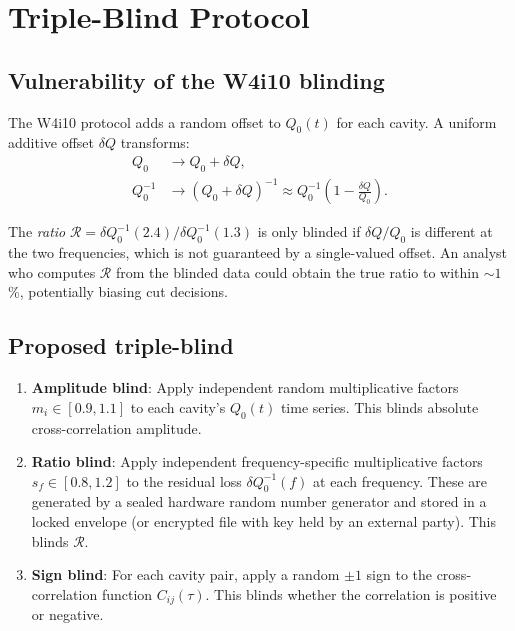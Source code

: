 \documentclass[11pt]{article}
\theoremstyle{definition}
\theoremstyle{remark}
\begin{document}
\section{Triple-Blind Protocol}
\label{sec:triple_blind}

\subsection{Vulnerability of the W4i10 blinding}

The W4i10 protocol adds a random offset to $Q_0(t)$ for each cavity.
A uniform additive offset $\delta Q$ transforms:
\begin{align}
Q_0 &\to Q_0 + \delta Q, \\
Q_0^{-1} &\to (Q_0 + \delta Q)^{-1}
\approx Q_0^{-1}\left(1 - \frac{\delta Q}{Q_0}\right).
\end{align}

The \emph{ratio} $\mathcal{R} = \delta Q_0^{-1}(2.4)/\delta Q_0^{-1}(1.3)$
is only blinded if $\delta Q/Q_0$ is different at the two frequencies,
which is not guaranteed by a single-valued offset. An analyst who
computes $\mathcal{R}$ from the blinded data could obtain the true
ratio to within $\sim 1$\%, potentially biasing cut decisions.

\subsection{Proposed triple-blind}

\begin{enumerate}
\item \textbf{Amplitude blind}: Apply independent random multiplicative
  factors $m_i \in [0.9, 1.1]$ to each cavity's $Q_0(t)$ time series.
  This blinds absolute cross-correlation amplitude.

\item \textbf{Ratio blind}: Apply independent frequency-specific
  multiplicative factors $s_f \in [0.8, 1.2]$ to the residual loss
  $\delta Q_0^{-1}(f)$ at each frequency. These are generated by a
  sealed hardware random number generator and stored in a locked
  envelope (or encrypted file with key held by an external party).
  This blinds $\mathcal{R}$.

\item \textbf{Sign blind}: For each cavity pair, apply a random
  $\pm 1$ sign to the cross-correlation function $C_{ij}(\tau)$.
  This blinds whether the correlation is positive or negative.
\end{enumerate}
\end{document}
